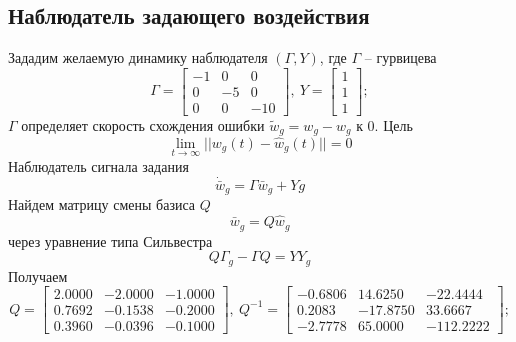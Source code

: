 \documentclass[a4paper, 12pt]{article}
\begin{document}
    \subsection{Наблюдатель задающего воздействия}
    Зададим желаемую динамику наблюдателя $\left( \Gamma,Y \right)$, где $\Gamma$ -- гурвицева
    $$
    \Gamma=\begin{bmatrix}
        -1 &0 &0\\
        0 &-5 &0\\
        0 &0 &-10
    \end{bmatrix},\ Y=\begin{bmatrix}
        1\\1\\1
    \end{bmatrix};
    $$
    $\Gamma$ определяет скорость схождения ошибки $\tilde{w}_g=w_g-\hat{w}_g$ к 0. Цель
    $$
    \lim\limits_{t\to\infty}||w_g(t)-\hat{w}_g(t)||=0
    $$
    Наблюдатель сигнала задания
    $$
    \dot{\bar{w}}_g=\Gamma\bar{w}_g+Yg
    $$
    Найдем матрицу смены базиса $Q$
    $$
    \bar{w}_g=Q\hat{w}_g
    $$
    через уравнение типа Сильвестра
    $$
    Q\Gamma_g-\Gamma Q=YY_g
    $$
    Получаем
    $$
    Q=\begin{bmatrix}
        2.0000   &-2.0000   &-1.0000\\
    0.7692   &-0.1538   &-0.2000\\
    0.3960   &-0.0396   &-0.1000
    \end{bmatrix},\ Q^{-1}=\begin{bmatrix}
        -0.6806   &14.6250  &-22.4444\\
    0.2083  &-17.8750   &33.6667\\
   -2.7778   &65.0000 &-112.2222
    \end{bmatrix};
    $$
\end{document}
